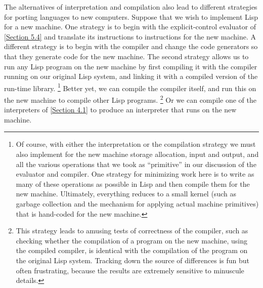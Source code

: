 The alternatives of interpretation and compilation also lead to different strategies for porting languages to new computers.
Suppose that we wish to implement Lisp for a new machine.
One strategy is to begin with the explicit-control evaluator of \cref{Section 5.4} and translate its instructions to instructions for the new machine.
A different strategy is to begin with the compiler and change the code generators so that they generate code for the new machine.
The second strategy allows us to run any Lisp program on the new machine by first compiling it with the compiler running on our original Lisp system, and linking it with a compiled version of the run-time library.%
\footnote{
	Of course, with either the interpretation or the compilation strategy we must also implement for the new machine storage allocation, input and output, and all the various operations that we took as “primitive” in our discussion of the evaluator and compiler.
	One strategy for minimizing work here is to write as many of these operations as possible in Lisp and then compile them for the new machine.
	Ultimately, everything reduces to a small kernel (such as garbage collection and the mechanism for applying actual machine primitives) that is hand-coded for the new machine.
}
Better yet, we can compile the compiler itself, and run this on the new machine to compile other Lisp programs.%
\footnote{
	This strategy leads to amusing tests of correctness of the compiler, such as checking whether the compilation of a program on the new machine, using the compiled compiler, is identical with the compilation of the program on the original Lisp system.
	Tracking down the source of differences is fun but often frustrating, because the results are extremely sensitive to minuscule details.
}
Or we can compile one of the interpreters of \cref{Section 4.1} to produce an interpreter that runs on the new machine.



